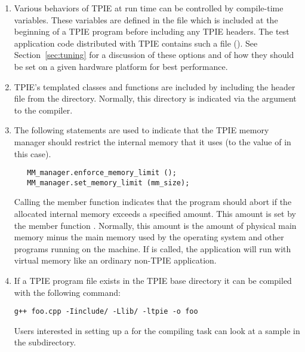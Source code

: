 \begin{enumerate}
    
    \item Various behaviors of TPIE at run time can be
    controlled by compile-time variables.  These variables
    are defined in the file 
     which is included
    at the beginning of a TPIE program before including any
    TPIE headers. The test application code distributed with TPIE contains such a
    file (). See
    Section~\ref{sec:tuning} for a discussion of these
    options and of how they should be set on a given
    hardware platform for best performance.
    
    \item TPIE's templated classes and functions are
    included by including the header file 
    from the  directory. Normally, this
    directory is indicated via the  argument to
    the compiler.
    
    \item The following statements are used to indicate that
    the TPIE memory manager  should
    restrict the internal memory that it uses (to the value
    of  in this case).

\begin{verbatim}
   MM_manager.enforce_memory_limit ();
   MM_manager.set_memory_limit (mm_size);
\end{verbatim}
    
    Calling the  member function
     indicates that the
    program should abort if the allocated internal memory
    exceeds a specified amount. This amount is set by the
    member function .
    Normally, this amount is the amount of physical main
    memory minus the main memory used by the operating
    system and other programs running on the machine. If
     is called,
    the application will run with virtual memory like an
    ordinary non-TPIE application.
    
    \item If a TPIE program file  exists in
    the TPIE base directory it can be compiled with the
    following command:

\begin{verbatim}
g++ foo.cpp -Iinclude/ -Llib/ -ltpie -o foo
\end{verbatim}
    
    Users interested in setting up a  for
    the compiling task can look at a sample
     in the  subdirectory.
\end{enumerate}


